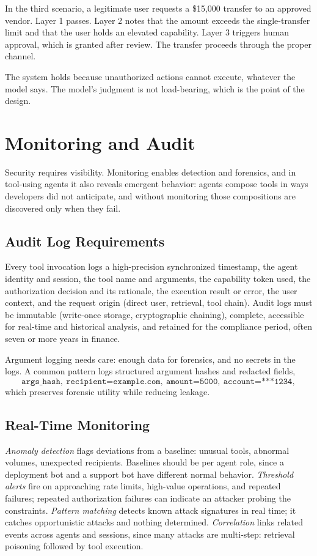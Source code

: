 \documentclass[11pt]{book}
\begin{document}
In the third scenario, a legitimate user requests a \$15{,}000 transfer to an approved vendor. Layer 1 passes. Layer 2 notes that the amount exceeds the single-transfer limit and that the user holds an elevated capability. Layer 3 triggers human approval, which is granted after review. The transfer proceeds through the proper channel.

The system holds because unauthorized actions cannot execute, whatever the model says. The model's judgment is not load-bearing, which is the point of the design.

\section{Monitoring and Audit}

Security requires visibility. Monitoring enables detection and forensics, and in tool-using agents it also reveals emergent behavior: agents compose tools in ways developers did not anticipate, and without monitoring those compositions are discovered only when they fail.

\subsection{Audit Log Requirements}

Every tool invocation logs a high-precision synchronized timestamp, the agent identity and session, the tool name and arguments, the capability token used, the authorization decision and its rationale, the execution result or error, the user context, and the request origin (direct user, retrieval, tool chain). Audit logs must be immutable (write-once storage, cryptographic chaining), complete, accessible for real-time and historical analysis, and retained for the compliance period, often seven or more years in finance.

Argument logging needs care: enough data for forensics, and no secrets in the logs. A common pattern logs structured argument hashes and redacted fields,
\[
\texttt{args\_hash},\ \texttt{recipient=example.com},\ \texttt{amount=5000},\ \texttt{account=***1234},
\]
which preserves forensic utility while reducing leakage.

\subsection{Real-Time Monitoring}

\textit{Anomaly detection} flags deviations from a baseline: unusual tools, abnormal volumes, unexpected recipients. Baselines should be per agent role, since a deployment bot and a support bot have different normal behavior. \textit{Threshold alerts} fire on approaching rate limits, high-value operations, and repeated failures; repeated authorization failures can indicate an attacker probing the constraints. \textit{Pattern matching} detects known attack signatures in real time; it catches opportunistic attacks and nothing determined. \textit{Correlation} links related events across agents and sessions, since many attacks are multi-step: retrieval poisoning followed by tool execution.
\end{document}
